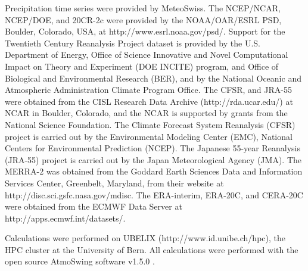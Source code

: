 \documentclass{ametsoc}
\begin{document}
Precipitation time series were provided by MeteoSwiss. The NCEP/NCAR, NCEP/DOE, and 20CR-2c were provided by the NOAA/OAR/ESRL PSD, Boulder, Colorado, USA, at http://www.esrl.noaa.gov/psd/. Support for the Twentieth Century Reanalysis Project dataset is provided by the U.S. Department of Energy, Office of Science Innovative and Novel Computational Impact on Theory and Experiment (DOE INCITE) program, and Office of Biological and Environmental Research (BER), and by the National Oceanic and Atmospheric Administration Climate Program Office. The CFSR, and JRA-55 were obtained from the CISL Research Data Archive (http://rda.ucar.edu/) at NCAR in Boulder, Colorado, and the NCAR is supported by grants from the National Science Foundation. The Climate Forecast System Reanalysis (CFSR) project is carried out by the Environmental Modeling Center (EMC), National Centers for Environmental Prediction (NCEP). The Japanese 55-year Reanalysis (JRA-55) project is carried out by the Japan Meteorological Agency (JMA). The MERRA-2 was obtained from the Goddard Earth Sciences Data and Information Services Center, Greenbelt, Maryland, from their website at http://disc.sci.gsfc.nasa.gov/mdisc. The ERA-interim, ERA-20C, and CERA-20C were obtained from the ECMWF Data Server at http://apps.ecmwf.int/datasets/. 

Calculations were performed on UBELIX (http://www.id.unibe.ch/hpc), the HPC cluster at the University of Bern. All calculations were performed with the open source AtmoSwing software v1.5.0 \citep{Horton2017a}.


%



\end{document}

